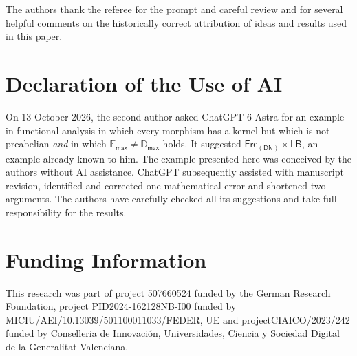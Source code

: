 \documentclass[11pt, a4paper, reqno]{amsart}
\theoremstyle{definition}
\newcommand{\EE}{\mathbb{E}}
\newcommand{\DD}{\mathbb{D}}
\newcommand{\FreDN}{\mathsf{Fre}_{\mathsf{(DN)}}}
\newcommand{\LB}{\mathsf{LB}}
\begin{document}
\small

The authors thank the referee for the prompt and careful review and for several helpful comments on the historically correct attribution of ideas and results used in this paper.

\normalsize

\vspace{-3pt}

\section*{Declaration of the Use of AI}

\vspace{-3pt}

\small

On 13 October 2026, the second author asked ChatGPT-6 Astra for an example in functional analysis in which every morphism has a kernel but which is not preabelian \emph{and} in which $\EE_{\mathsf{max}}\not=\DD_{\mathsf{max}}$ holds. It suggested $\FreDN\times\LB$, an example already known to him. The example presented here was conceived by the authors without AI assistance. ChatGPT subsequently assisted with manuscript revision, identified and corrected one mathematical error and shortened two arguments. The authors have carefully checked all its suggestions and take full responsibility for the results.

\normalsize

\vspace{-0pt}

\section*{Funding Information}

\vspace{-2pt}

\small

This research was part of project 507660524 funded by the German Research Foundation, project PID2024-162128NB-I00 funded by MICIU/AEI/10.13039/501100011033/FEDER, UE and project\linebreak{}CIAICO/2023/242 funded by Conselleria de Innovaci\'on, Universidades, Ciencia y Sociedad Digital de la Generalitat Valenciana.

\normalsize
\end{document}
